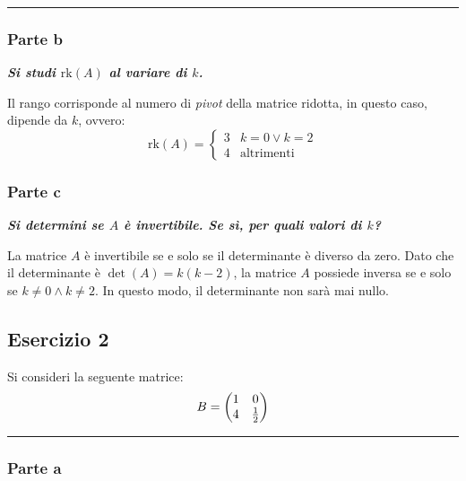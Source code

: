 \documentclass[a4paper]{article}
\makeatletter
\newcommand{\longline}{\noindent\rule{\textwidth}{0.4pt}}
\newenvironment{rowequmat}[1]{\left(\array{@{}#1@{}}}{\endarray\right)}
\makeatother
\begin{document}
	\longline

	\subsubsection{Parte b}

	\textcolor{Green4}{\textbf{\emph{Si studi $\mathrm{rk}\left(A\right)$ al variare di $k$.}}}\newline

	\noindent
	Il rango corrisponde al numero di \emph{pivot} della matrice ridotta, in questo caso, dipende da $k$, ovvero:
	\begin{equation*}
		\mathrm{rk}\left(A\right) = \begin{cases}
			3 & k = 0 \lor k = 2 \\
			4 & \text{altrimenti}
		\end{cases}
	\end{equation*}\newpage

	\subsubsection{Parte c}

	\textcolor{Green4}{\textbf{\emph{Si determini se $A$ è invertibile. Se sì, per quali valori di $k$?}}}\newline

	\noindent
	La matrice $A$ è invertibile se e solo se il determinante è diverso da zero. Dato che il determinante è $\det\left(A\right) = k\left(k-2\right)$, la matrice $A$ possiede inversa se e solo se $k \ne 0 \land k \ne 2$. In questo modo, il determinante non sarà mai nullo.\newpage

	\subsection{Esercizio 2}

	Si consideri la seguente matrice:
	\begin{equation*}
		B = \begin{rowequmat}{cc}
			1 & 0 \\
			4 & \frac{1}{2}
		\end{rowequmat}
	\end{equation*}

	\longline

	\subsubsection{Parte a}
\end{document}

